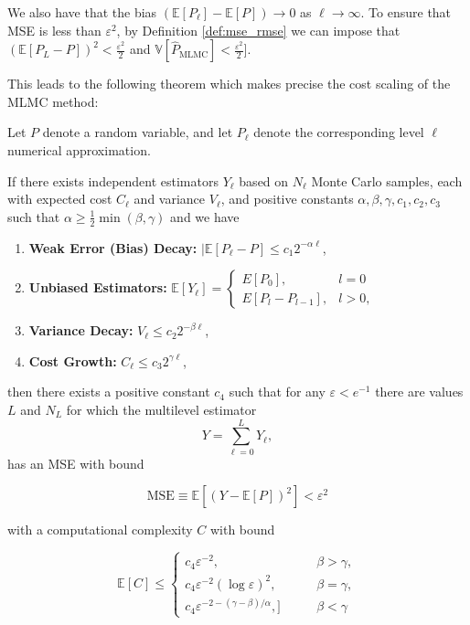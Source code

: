 We also have that the bias $(\mathbb{E}[P_\ell] - \mathbb{E}[P]) \to 0$ as $\ell \to \infty$. 
To ensure that MSE is less than $\varepsilon^2$, by Definition \ref{def:mse_rmse} we can 
impose that 
$(\mathbb{E}[P_L  - P])^2 < \frac{\varepsilon^2}{2}$ and 
$\mathbb{V}[\hat{P}_{\mathrm{MLMC}}] < \frac{\varepsilon^2}{2}]$. 

This leads to the following theorem \cite{giles2015multilevel} which makes 
precise the cost scaling of the MLMC method:

\begin{theorem}
    Let $P$ denote a random variable, and let $P_\ell$ denote the corresponding 
    level $\ell$ numerical approximation. 

    If there exists independent estimators $Y_\ell$ based on $N_\ell$ Monte Carlo
    samples, each with expected cost $C_\ell$ and variance $V_\ell$, and 
    positive constants $\alpha, \beta, \gamma,c_1, c_2, c_3$ such that 
    $\alpha \geq \frac{1}{2} \min(\beta, \gamma)$ and we have
    \begin{enumerate}
        \item \textbf{Weak Error (Bias) Decay: } $|\mathbb{E}[P_\ell - P] \leq c_1 2^{-\alpha \ell}$,
        \item \textbf{Unbiased Estimators: } $\mathbb{E}[Y_\ell] = 
        \begin{cases}
            E[P_0], & l = 0 \\
            E[P_l - P_{l-1}], & l > 0,
        \end{cases}
        $
        \item \textbf{Variance Decay: } $V_\ell \leq c_2 2^{-\beta \ell}$,
        \item \textbf{Cost Growth: } $C_\ell \leq c_3 2^{\gamma \ell}$,
    \end{enumerate}
    then there exists a positive constant $c_4$ such that for any $\varepsilon < e^{-1}$ there
    are values $L$ and $N_L$ for which the multilevel estimator 
    \begin{equation*}
        Y = \sum_{\ell = 0}^L Y_\ell,
    \end{equation*}
    has an MSE with bound 

    \begin{equation}
        \text{MSE} \equiv \mathbb{E}\left[(Y - \mathbb{E}[P])^2\right] < \varepsilon^2
    \end{equation}

    with a computational complexity $C$ with bound

    \begin{equation}
        \mathbb{E}[C] \leq
        \begin{cases}
            c_4 \varepsilon^{-2}, \qquad &\beta > \gamma,\\
            c_4\varepsilon^{-2}(\log \varepsilon)^2, \qquad &\beta = \gamma,\\
            c_4\varepsilon^{-2-(\gamma - \beta)/\alpha}, ]\qquad &\beta < \gamma
        \end{cases}
    \end{equation}
\end{theorem}

